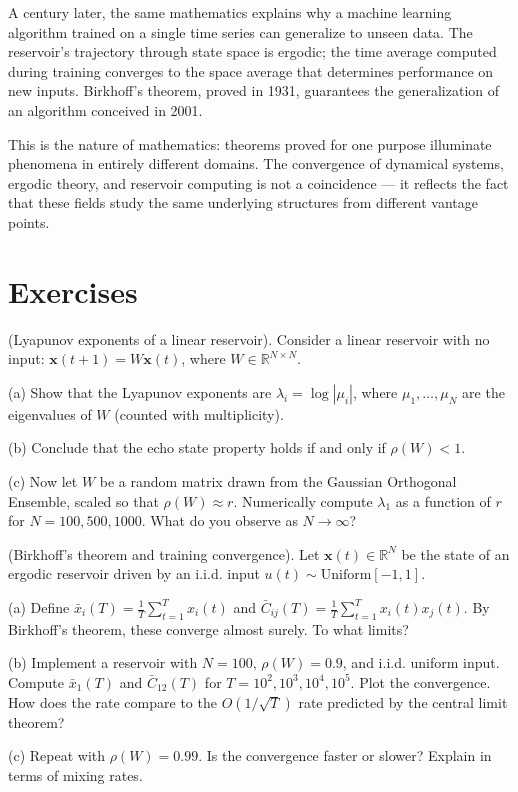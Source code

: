 A century later, the same mathematics explains why a machine learning algorithm trained on a single time series can generalize to unseen data. The reservoir's trajectory through state space is ergodic; the time average computed during training converges to the space average that determines performance on new inputs. Birkhoff's theorem, proved in 1931, guarantees the generalization of an algorithm conceived in 2001.

This is the nature of mathematics: theorems proved for one purpose illuminate phenomena in entirely different domains. The convergence of dynamical systems, ergodic theory, and reservoir computing is not a coincidence --- it reflects the fact that these fields study the same underlying structures from different vantage points.


\bigskip


\section*{Exercises}

\begin{exercise}
(Lyapunov exponents of a linear reservoir). Consider a linear reservoir with no input: $\mathbf{x}(t+1) = W \mathbf{x}(t)$, where $W \in \mathbb{R}^{N \times N}$.

(a) Show that the Lyapunov exponents are $\lambda_i = \log |\mu_i|$, where $\mu_1, \ldots, \mu_N$ are the eigenvalues of $W$ (counted with multiplicity).

(b) Conclude that the echo state property holds if and only if $\rho(W) < 1$.

(c) Now let $W$ be a random matrix drawn from the Gaussian Orthogonal Ensemble, scaled so that $\rho(W) \approx r$. Numerically compute $\lambda_1$ as a function of $r$ for $N = 100, 500, 1000$. What do you observe as $N \to \infty$?
\end{exercise}


\begin{exercise}
(Birkhoff's theorem and training convergence). Let $\mathbf{x}(t) \in \mathbb{R}^N$ be the state of an ergodic reservoir driven by an i.i.d. input $u(t) \sim \text{Uniform}[-1, 1]$.

(a) Define $\bar{x}_i(T) = \frac{1}{T} \sum_{t=1}^T x_i(t)$ and $\bar{C}_{ij}(T) = \frac{1}{T} \sum_{t=1}^T x_i(t) x_j(t)$. By Birkhoff's theorem, these converge almost surely. To what limits?

(b) Implement a reservoir with $N = 100$, $\rho(W) = 0.9$, and i.i.d. uniform input. Compute $\bar{x}_1(T)$ and $\bar{C}_{12}(T)$ for $T = 10^2, 10^3, 10^4, 10^5$. Plot the convergence. How does the rate compare to the $O(1/\sqrt{T})$ rate predicted by the central limit theorem?

(c) Repeat with $\rho(W) = 0.99$. Is the convergence faster or slower? Explain in terms of mixing rates.
\end{exercise}


